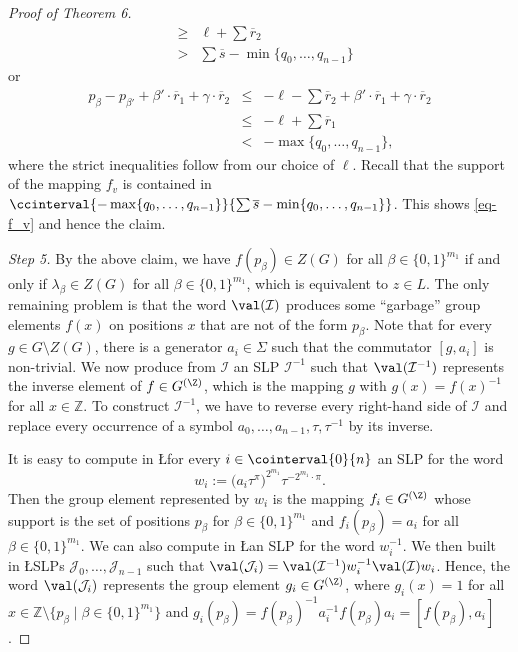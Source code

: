 \begin{proof}[Proof of Theorem 6]
\begin{eqnarray*}
& \geq & \ell + \sum \overline{r}_2 \\
& > & \sum \overline{s} -  \min\{ q_0, \ldots, q_{n-1}\}
\end{eqnarray*}
or
\begin{eqnarray*}
p_{\beta} - p_{\beta'} +\beta' \cdot \overline{r}_1 + \gamma \cdot \overline{r}_2 & \leq & -\ell - \sum \overline{r}_2 + \beta' \cdot \overline{r}_1 + \gamma \cdot \overline{r}_2 \\
& \leq & -\ell + \sum \overline{r}_1  \\
& < &  - \max\{ q_0, \ldots, q_{n-1}\},
\end{eqnarray*}
where the strict inequalities follow from our choice of $\ell$.
Recall that the support of the mapping $f_v$ is contained  in $\ccinterval{-\max\{ q_0, \ldots, q_{n-1}\}}{\sum \overline{s}-\min\{ q_0, \ldots, q_{n-1}\}}$.
This shows \eqref{eq-f_v} and hence the claim.



\medskip
\noindent
{\em Step 5.} By the above claim, we have $f(p_{\beta}) \in Z(G)$ for all $\beta \in \{0,1\}^{m_1}$ if and only if 
$\lambda_{\beta} \in Z(G)$ for all $\beta \in \{0,1\}^{m_1}$, which is equivalent to $z \in L$. 
The only remaining problem is that the word $\val(\mathcal{I})$ produces some ``garbage'' group elements $f(x)$ on 
positions $x$ that are not of the form $p_\beta$. Note that for every $g \in G \setminus Z(G)$, there is a generator $a_i \in \Sigma$ such that the commutator 
$[g,a_i]$ is non-trivial. We now produce from $\mathcal{I}$ an SLP $\mathcal{I}^{-1}$ such that $\val(\mathcal{I}^{-1})$ represents
the inverse element of $f \in G^{(\Z)}$, which is the mapping $g$ with $g(x) = f(x)^{-1}$ for all $x \in \mathbb{Z}$. To construct $\mathcal{I}^{-1}$,
we have to reverse every right-hand side of $\mathcal{I}$ and replace every occurrence of a symbol $a_0, \ldots, a_{n-1}, \tau, \tau^{-1}$ by
its inverse. 

It is easy to compute in \L for every $i \in \cointerval{0}{n}$ an SLP for the word 
\[ 
w_i := \big(a_i \tau^\pi \big)^{2^{m_1}} \tau^{-2^{m_1} \cdot \pi} .
\]
Then the group element represented by $w_i$ is the mapping $f_i \in G^{(\Z)}$  whose  support 
is the set of positions $p_\beta$ for $\beta \in \{0,1\}^{m_1}$ and 
$f_i(p_\beta) = a_i$ for all $\beta \in \{0,1\}^{m_1}$.
We can also compute in \L an SLP for the word $w_i^{-1}$.
We then built in \L SLPs $\mathcal{J}_0, \ldots, \mathcal{J}_{n-1}$ such that $\val(\mathcal{J}_i) = \val(\mathcal{I}^{-1}) w_i^{-1} \val(\mathcal{I}) w_i$.
Hence, the word $\val(\mathcal{J}_i)$ represents the group element $g_i \in G^{(\Z)}$, where $g_i(x) = 1$ for all 
$x \in \mathbb{Z}\setminus \{ p_\beta \mid \beta \in \{0,1\}^{m_1} \}$ and 
$g_i(p_\beta) = f(p_\beta)^{-1} a_i^{-1} f(p_\beta) a_i  = [f(p_\beta),a_i]$. 


\end{proof}
